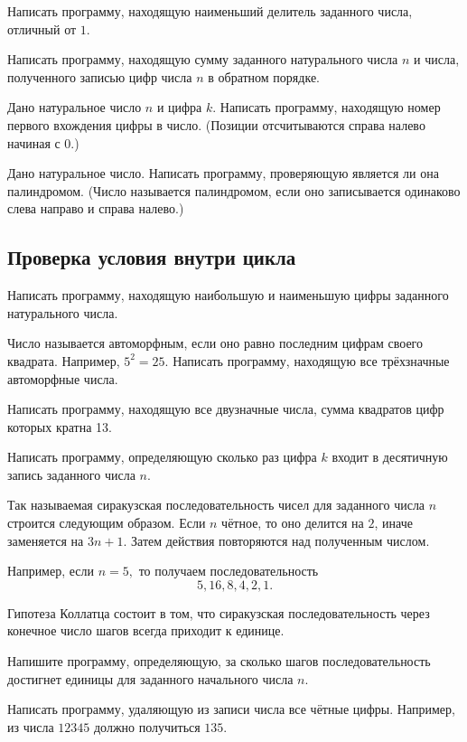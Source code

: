 \task Написать программу, находящую наименьший делитель заданного
числа, отличный от $1.$

\task Написать программу, находящую сумму заданного натурального числа
$n$ и числа, полученного записью цифр числа $n$ в обратном порядке.

\task Дано натуральное число $n$ и цифра $k.$ Написать программу,
находящую номер первого вхождения цифры в число. (Позиции
отсчитываются справа налево начиная с 0.)

\task Дано натуральное число. Написать программу, проверяющую является
ли она палиндромом. (Число называется палиндромом, если
оно записывается одинаково слева направо и справа налево.)


\subsection{Проверка условия внутри цикла}

\task Написать программу, находящую наибольшую и наименьшую цифры
заданного натурального числа.

\task Число называется автоморфным, если оно
равно последним цифрам своего квадрата. Например, $5^2=25$. Написать
программу, находящую все трёхзначные автоморфные числа.

\task Написать программу, находящую все двузначные числа, сумма
квадратов цифр которых кратна 13.

\task Написать программу, определяющую сколько раз цифра $k$ входит в
десятичную запись заданного числа $n$.

\task Так называемая сиракузская
последовательность чисел для
заданного числа $n$ строится следующим образом. Если $n$ чётное, то
оно делится на $2$, иначе заменяется на $3n+1$. Затем действия
повторяются над полученным числом.

Например, если $n=5,$ то получаем последовательность
\[
5, 16, 8, 4, 2, 1.
\]

Гипотеза Коллатца состоит в том, что
сиракузская последовательность через конечное число шагов всегда
приходит к единице.

Напишите программу, определяющую, за сколько шагов последовательность
достигнет единицы для заданного начального числа $n$.

\task Написать программу, удаляющую из записи числа все чётные
цифры. Например, из числа $12345$ должно получиться $135$.

